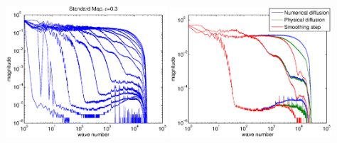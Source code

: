 \documentclass[12pt,t]{beamer}
\begin{document}
\begin{frame}
\begin{center}
\includegraphics[width=0.45\textwidth,trim=1cm 1cm 0cm 0cm]{standardmapfreqevolve}
\includegraphics[width=0.45\textwidth,trim=1cm 1cm 0cm 0cm]{standardmapfreqcompare}
\end{center}
\end{frame}
\end{document}
